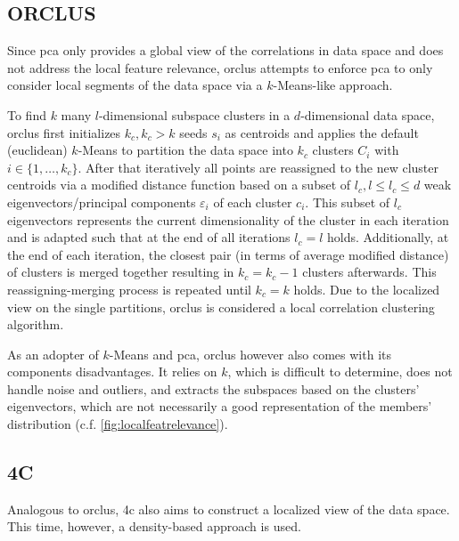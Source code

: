 \subsection{ORCLUS}
Since \gls{pca} only provides a global view of the correlations in data space and does not address the local feature relevance, \gls{orclus} attempts to enforce \gls{pca} to only consider local segments of the data space via a $k$-Means-like approach. 

To find $k$ many $l$-dimensional subspace clusters in a $d$-dimensional data space, \gls{orclus} first initializes $k_c, k_c > k$ seeds $s_i$ as centroids and applies the default (euclidean) $k$-Means to partition the data space into $k_c$ clusters $C_i$ with $i \in \{1,\dotsc,k_c\}$. 
After that iteratively all points are reassigned to the new cluster centroids via a modified distance function based on a subset of $l_c, l\leq l_c \leq d$ weak eigenvectors/principal components $\varepsilon_i$ of each cluster $c_i$. This subset of $l_c$ eigenvectors represents the current dimensionality of the cluster in each iteration and is adapted such that at the end of all iterations $l_c=l$ holds. Additionally, at the end of each iteration, the closest pair (in terms of average modified distance) of clusters is merged together resulting in $k_c = k_c-1$ clusters afterwards. 
This reassigning-merging process is repeated until $k_c = k$ holds. Due to the localized view on the single partitions, \gls{orclus} is considered a local correlation clustering algorithm\cite{orclusaggarwal2000finding}.

As an adopter of $k$-Means and \gls{pca}, \gls{orclus} however also comes with its components disadvantages. It relies on $k$, which is difficult to determine, does not handle noise and outliers, and extracts the subspaces based on the clusters' eigenvectors, which are not necessarily a good representation of the members' distribution (c.f. \autoref{fig:localfeatrelevance}).


\subsection{4C}\label{ssec:4c}
Analogous to \gls{orclus}, \gls{4c} also aims to construct a localized view of the data space. This time, however, a density-based approach is used. 

